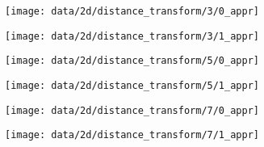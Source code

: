 \begin{figure}
  \begin{subfigure}[t]{0.12\textwidth}
    \texttt{[image: data/2d/distance\_transform/3/0\_appr]}
  \end{subfigure}
  \begin{subfigure}[t]{0.12\textwidth}
    \texttt{[image: data/2d/distance\_transform/3/1\_appr]}
  \end{subfigure}\hspace{0.5cm}
  \begin{subfigure}[t]{0.12\textwidth}
    \texttt{[image: data/2d/distance\_transform/5/0\_appr]}
  \end{subfigure}
  \begin{subfigure}[t]{0.12\textwidth}
    \texttt{[image: data/2d/distance\_transform/5/1\_appr]}
  \end{subfigure}\hspace{0.5cm}
  \begin{subfigure}[t]{0.12\textwidth}
    \texttt{[image: data/2d/distance\_transform/7/0\_appr]}
  \end{subfigure}
  \begin{subfigure}[t]{0.12\textwidth}
    \texttt{[image: data/2d/distance\_transform/7/1\_appr]}
  \end{subfigure}
  
  

\end{figure}

